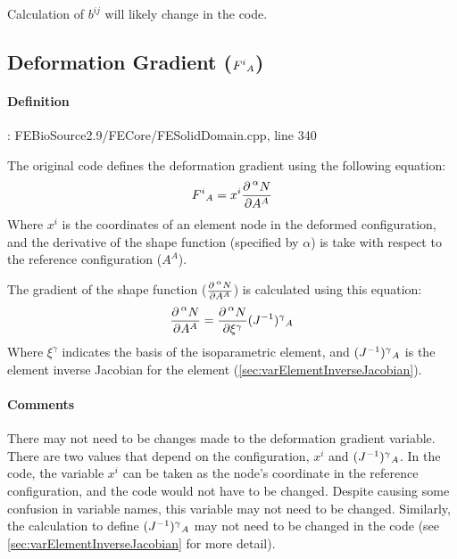 \documentclass{article}
\begin{document}
    Calculation of $b^{ij}$ will likely change in the code.

\subsection*{Deformation Gradient ($F^i\mathstrut_A$)}

    \paragraph{Definition}: FEBioSource2.9/FECore/FESolidDomain.cpp, line 340

    The original code defines the deformation gradient using the following equation:
    \begin{equation*}
        F^i\mathstrut_A = x^i \frac{\partial \prescript{\alpha}{}N}{\partial A^A}
    \end{equation*}
    Where $x^i$ is the coordinates of an element node in the deformed configuration, and the derivative of the shape function (specified by $\alpha$) is take with respect to the reference configuration ($A^A$).

    The gradient of the shape function ($\frac{\partial \prescript{\alpha}{}N}{\partial A^A}$) is calculated using this equation:
    \begin{equation*}
        \frac{\partial \prescript{\alpha}{}N}{\partial A^A} = \frac{\partial \prescript{\alpha}{}N}{\partial \xi^\gamma}(J^{-1})^\gamma\mathstrut_A
    \end{equation*}
    Where $\xi^\gamma$ indicates the basis of the isoparametric element, and $(J^{-1})^\gamma\mathstrut_A$ is the element inverse Jacobian for the element (\autoref{sec:varElementInverseJacobian}).

    \paragraph{Comments}
    There may not need to be changes made to the deformation gradient variable. There are two values that depend on the configuration, $x^i$ and $(J^{-1})^\gamma\mathstrut_A$. In the code, the variable $x^i$ can be taken as the node's coordinate in the reference configuration, and the code would not have to be changed. Despite causing some confusion in variable names, this variable may not need to be changed. Similarly, the calculation to define $(J^{-1})^\gamma\mathstrut_A$ may not need to be changed in the code (see \autoref{sec:varElementInverseJacobian} for more detail).
    
\end{document}
